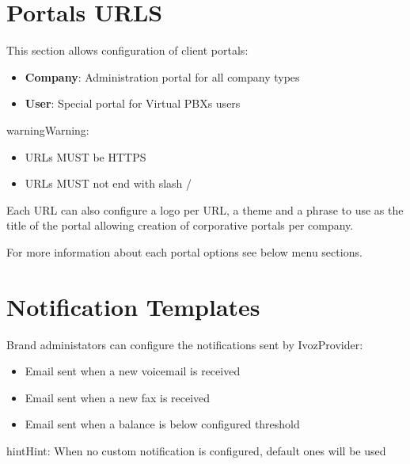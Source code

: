 \documentclass[letterpaper,10pt,english]{sphinxmanual}
\begin{document}
\section{Portals URLS}
\label{brand/portal_urls:portals-urls}\label{brand/portal_urls::doc}
This section allows configuration of client portals:
\begin{itemize}
\item {} 
\textbf{Company}: Administration portal for all company types

\item {} 
\textbf{User}: Special portal for Virtual PBXs users

\end{itemize}

\begin{notice}{warning}{Warning:}\begin{itemize}
\item {} 
URLs MUST be HTTPS

\item {} 
URLs MUST not end with slash /

\end{itemize}
\end{notice}

Each URL can also configure a logo per URL, a theme and a phrase to use as
the title of the portal allowing creation of corporative portals per company.

For more information about each portal options see below menu sections.


\section{Notification Templates}
\label{brand/notifications::doc}\label{brand/notifications:notification-templates}\label{brand/notifications:id1}
Brand administators can configure the notifications sent by IvozProvider:
\begin{itemize}
\item {} 
Email sent when a new voicemail is received

\item {} 
Email sent when a new fax is received

\item {} 
Email sent when a balance is below configured threshold

\end{itemize}

\begin{notice}{hint}{Hint:}
When no custom notification is configured, default ones will be used
\end{notice}
\end{document}
